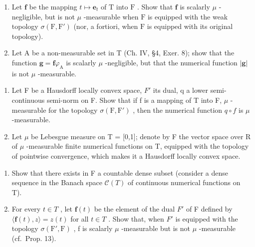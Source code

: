 \begin{enumerate}
\def\labelenumi{\alph{enumi})}
\item
  Let \(\mathbf{f}\) be the mapping \(t \mapsto \mathbf{e}_t\) of \(\mathrm{T}\) into \(\mathrm{F}\) . Show that \(\mathbf{f}\) is scalarly \(\mu\) -negligible, but is not \(\mu\) -measurable when \(\mathrm{F}\) is equipped with the weak topology \(\sigma(\mathrm{F}, \mathrm{F}')\) (nor, a fortiori, when \(\mathrm{F}\) is equipped with its original topology).
\item
  Let A be a non-measurable set in T (Ch. IV, §4, Exer. 8); show that the function \(\mathbf{g} = \mathbf{f}\varphi_{\mathrm{A}}\) is scalarly \(\mu\) -negligible, but that the numerical function \(|\mathbf{g}|\) is not \(\mu\) -measurable.
\end{enumerate}

\begin{enumerate}
\def\labelenumi{\arabic{enumi})}
\setcounter{enumi}{12}
\item
  Let F be a Hausdorff locally convex space, \(F'\) its dual, q a lower semi-continuous semi-norm on F. Show that if f is a mapping of T into F, \(\mu\) -measurable for the topology \(\sigma(\mathrm{F},\mathrm{F}')\) , then the numerical function \(q \circ f\) is \(\mu\) -measurable.
\item
  Let \(\mu\) be Lebesgue measure on T = {[}0,1{]}; denote by F the vector space over R of \(\mu\) -measurable finite numerical functions on T, equipped with the topology of pointwise convergence, which makes it a Hausdorff locally convex space.
\end{enumerate}

\begin{enumerate}
\def\labelenumi{\alph{enumi})}
\item
  Show that there exists in F a countable dense subset (consider a dense sequence in the Banach space \(\mathcal{C}(T)\) of continuous numerical functions on T).
\item
  For every \(t \in T\) , let \(\mathbf{f}(t)\) be the element of the dual \(F'\) of F defined by \(\langle\mathbf{f}(t), z\rangle = z(t)\) for all \(t \in T\) . Show that, when \(F'\) is equipped with the topology \(\sigma(\mathrm{F}', \mathrm{F})\) , f is scalarly \(\mu\) -measurable but is not \(\mu\) -measurable (cf.~Prop. 13).
\end{enumerate}

